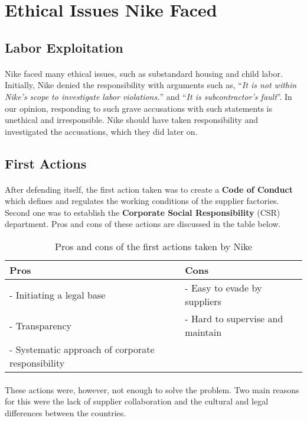 \section{Ethical Issues Nike Faced}

\subsection{Labor Exploitation}

\paragraph{} Nike faced many ethical issues, such as substandard housing and child labor. Initially, Nike denied the responsibility with arguments such as, \enquote{\textit{It is not within Nike’s scope to investigate labor violations.}} and \enquote{\textit{It is subcontractor's fault}}. In our opinion, responding to such grave accusations with such statements is unethical and irresponsible. Nike should have taken responsibility and investigated the accusations, which they did later on.

\subsection{First Actions}

\paragraph{} After defending itself, the first action taken was to create a \textbf{Code of Conduct} which defines and regulates the working conditions of the supplier factories. Second one was to establish the \textbf{Corporate Social Responsibility} (CSR) department. Pros and cons of these actions are discussed in the table below.

\begin{table}[H]
    \centering
    \begin{tabular}{|l|l|}
        \hline
        Pros & Cons \\
        \hline
        - Initiating a legal base & - Easy to evade by suppliers \\
        - Transparency & - Hard to supervise and maintain \\
        - Systematic approach of corporate responsibility & \\
        \hline
    \end{tabular}
    \caption{Pros and cons of the first actions taken by Nike}
    \label{tab:first-actions}
\end{table}

\paragraph{} These actions were, however, not enough to solve the problem. Two main reasons for this were the lack of supplier collaboration and the cultural and legal differences between the countries.
